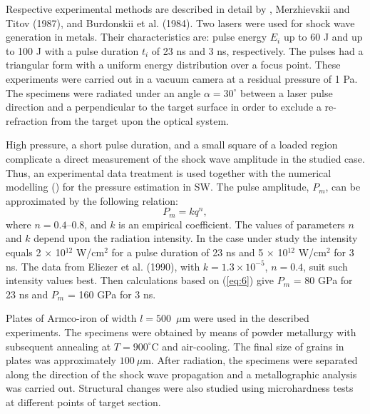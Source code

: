\documentclass[sw,bibself]{svjour}
\begin{document}
Respective experimental methods are described in detail by
\cite{ref2}, Merzhievskii and Titov
(1987), and Burdonskii et al. (1984).
Two lasers were used for shock wave generation in metals.
Their characteristics are: pulse energy $E_{i}$ up
to 60 J and up to 100 J with a pulse duration $t_{i}$
of 23 ns and 3 ns, respectively.
The pulses had a triangular form with a uniform energy distribution over
a focus point. These experiments were carried out in a vacuum camera
at a
residual pressure of 1 Pa. The specimens were radiated under an angle
$\alpha = 30^{\circ}$ between a laser pulse direction
and a perpendicular to the target surface
in order to exclude a re-refraction from the target upon the optical
system.

High pressure, a short pulse duration, and a small square of a loaded
region complicate a direct measurement of the shock wave amplitude in
the studied case. Thus, an experimental data treatment is used together
with the numerical modelling (\cite{ref12,ref8}) for the pressure
estimation in SW. The pulse amplitude, $P_{m}$, can be approximated by
the following relation:
\begin{equation}
P_{m} = kq^{n},
\label{eq:6}
\end{equation}
where $n = 0.4$--0.8, and $k$ is an empirical coefficient.
The values of parameters $n$ and $k$
depend upon the radiation intensity.
In the case under study the intensity equals
2 $\times$ 10$^{12}$ W/cm$^{2}$ for a pulse duration
of 23 ns and 5 $\times$ 10$^{12}$ W/cm$^{2}$ for 3 ns.
The data from Eliezer et al. (1990), with
$k = 1.3 \times 10^{-5}$, $n = 0.4$,
suit such intensity values best.
Then calculations based on (\ref{eq:6}) give $P_{m}$ = 80 GPa for 23 ns
and $P_{m}$ = 160 GPa
for 3 ns.

Plates of Armco-iron of width $l = 500$~$\mu$m
were used in the described experiments.
The specimens were obtained by means of powder metallurgy
with subsequent annealing at $T = 900 ^{\circ}$C
and air-cooling.
The final size of grains in plates was approximately $100~\mu$m.
After radiation, the specimens were separated along the direction of
the shock wave propagation and a metallographic analysis was
carried out.
Structural changes were also studied using microhardness tests at different
points of target section.
\end{document}
